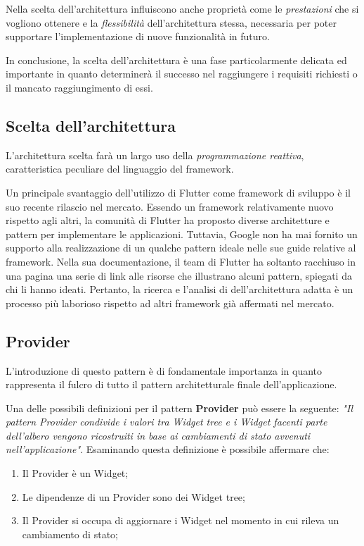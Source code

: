 Nella scelta dell'architettura influiscono anche proprietà come le \textit{prestazioni} che si vogliono ottenere e la \textit{flessibilità} dell'architettura stessa, necessaria per poter supportare l'implementazione di nuove funzionalità in futuro.

In conclusione, la scelta dell'architettura è una fase particolarmente delicata ed importante in quanto determinerà il successo nel raggiungere i requisiti richiesti o il mancato raggiungimento di essi.

\subsection{Scelta dell'architettura}
L'architettura scelta farà un largo uso della \textit{programmazione reattiva}, caratteristica peculiare del linguaggio del framework.

Un principale svantaggio dell'utilizzo di Flutter come framework di sviluppo è il suo recente rilascio nel mercato. Essendo un framework relativamente nuovo rispetto agli altri, la comunità di Flutter ha proposto diverse architetture e pattern per implementare le applicazioni. Tuttavia, Google non ha mai fornito un supporto alla realizzazione di un qualche pattern ideale nelle sue guide relative al framework. Nella sua documentazione, il team di Flutter ha soltanto racchiuso in una pagina una serie di link alle risorse che illustrano alcuni pattern, spiegati da chi li hanno ideati. Pertanto, la ricerca e l'analisi di dell'architettura adatta è un processo più laborioso rispetto ad altri framework già affermati nel mercato.

\newpage

\subsection{Provider}
L'introduzione di questo pattern è di fondamentale importanza in quanto rappresenta il fulcro di tutto il pattern architetturale finale dell'applicazione. 

Una delle possibili definizioni per il pattern \textbf{Provider} può essere la seguente: \textit{"Il pattern Provider condivide i valori tra Widget tree e i Widget facenti parte dell'albero vengono ricostruiti in base ai cambiamenti di stato avvenuti nell'applicazione"}. Esaminando questa definizione è possibile affermare che:
\begin{enumerate}
	\item Il Provider è un Widget;
	\item Le dipendenze di un Provider sono dei Widget tree;
	\item Il Provider si occupa di aggiornare i Widget nel momento in cui rileva un cambiamento di stato;
\end{enumerate}

